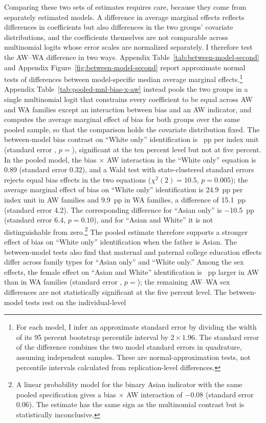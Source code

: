 Comparing these two sets of estimates requires care, because they come from separately estimated models. A difference in average marginal effects reflects differences in coefficients but also differences in the two groups' covariate distributions, and the coefficients themselves are not comparable across multinomial logits whose error scales are normalized separately. I therefore test the AW--WA difference in two ways. Appendix Table~\ref{tab:between-model-second} and Appendix Figure~\ref{fig:between-model-second} report approximate normal tests of differences between model-specific median average marginal effects.\footnote{For each model, I infer an approximate standard error by dividing the width of its 95 percent bootstrap percentile interval by $2\times1.96$. The standard error of the difference combines the two model standard errors in quadrature, assuming independent samples. These are normal-approximation tests, not percentile intervals calculated from replication-level differences.} Appendix Table~\ref{tab:pooled-mnl-bias-x-aw} instead pools the two groups in a single multinomial logit that constrains every coefficient to be equal across AW and WA families except an interaction between bias and an AW indicator, and computes the average marginal effect of bias for both groups over the same pooled sample, so that the comparison holds the covariate distribution fixed. The between-model bias contrast on ``White only'' identification is ~pp per index unit (standard error , $p = $), significant at the ten percent level but not at five percent. In the pooled model, the bias $\times$ AW interaction in the ``White only'' equation is 0.89 (standard error 0.32), and a Wald test with state-clustered standard errors rejects equal bias effects in the two equations ($\chi^2(2) = 10.5$, $p = 0.005$); the average marginal effect of bias on ``White only'' identification is 24.9~pp per index unit in AW families and 9.9~pp in WA families, a difference of 15.1~pp (standard error 4.2). The corresponding difference for ``Asian only'' is $-$10.5~pp (standard error 6.4, $p = 0.10$), and for ``Asian and White'' it is not distinguishable from zero.\footnote{A linear probability model for the binary Asian indicator with the same pooled specification gives a bias $\times$ AW interaction of $-$0.08 (standard error 0.06). The estimate has the same sign as the multinomial contrast but is statistically inconclusive.} The pooled estimate therefore supports a stronger effect of bias on ``White only'' identification when the father is Asian. The between-model tests also find that maternal and paternal college education effects differ across family types for ``Asian only'' and ``White only.'' Among the sex effects, the female effect on ``Asian and White'' identification is ~pp larger in AW than in WA families (standard error , $p = $); the remaining AW--WA sex differences are not statistically significant at the five percent level. The between-model tests rest on the individual-level 